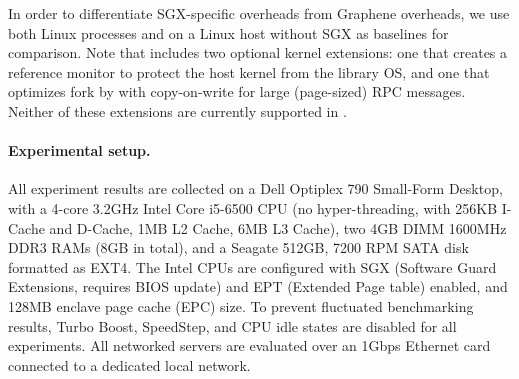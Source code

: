 
In order to differentiate SGX-specific overheads 
from Graphene overheads,
we use both
Linux processes and \graphene{} on a Linux host without SGX as baselines
for comparison.
Note that \graphene{} includes two optional kernel extensions:
one that creates a reference monitor to protect the host kernel from 
the library OS, and one that optimizes fork by 
with copy-on-write for large (page-sized) RPC messages.
Neither of these extensions are currently supported in \graphenesgx{}.



\paragraph{Experimental setup.}

All experiment results are collected on a Dell Optiplex 790 Small-Form Desktop,
with a 4-core 3.2GHz Intel Core i5-6500 CPU (no hyper-threading, with 256KB I-Cache and D-Cache, 1MB L2 Cache, 6MB L3 Cache),
two 4GB DIMM 1600MHz DDR3 RAMs (8GB in total), and a Seagate 512GB, 7200 RPM SATA disk formatted as EXT4.
The Intel CPUs are configured with SGX (Software Guard Extensions, requires BIOS update) and EPT (Extended Page table) enabled, and 128MB enclave page cache (EPC) size.
To prevent fluctuated benchmarking results,
Turbo Boost, SpeedStep, and CPU idle states are disabled for
all experiments.
All networked servers are evaluated over an 1Gbps Ethernet card connected to a dedicated local network.




